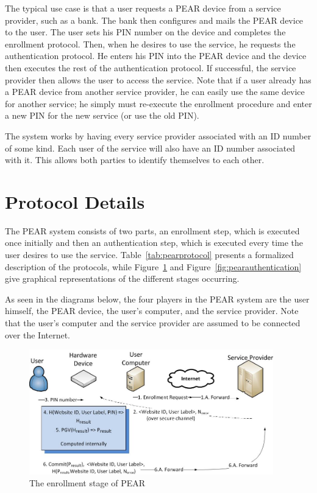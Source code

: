 The typical use case is that a user requests a PEAR device from a service provider, such as a bank. The bank then configures
and mails the PEAR device to the user. The user sets his PIN number on the device and completes the enrollment protocol.
Then, when he desires to use the service, he requests the authentication protocol. He enters his PIN into the PEAR device
and the device then executes the rest of the authentication protocol. If successful, the service provider then allows
the user to access the service. 
Note that if a user already has a PEAR device from another service provider, he can easily use the same device for another
service; he simply must re-execute the enrollment procedure and enter a new PIN for the new service (or use the old PIN).

The system works by having every service provider associated with an ID number of some kind. Each user of the service will
also have an ID number associated with it. This allows both parties to identify themselves to each other.

\section{Protocol Details}
The PEAR system consists of two parts, an enrollment step, which is executed once initially and then an authentication step,
which is executed every time the user desires to use the service.
Table~\ref{tab:pearprotocol} presents a formalized description of the protocols, while Figure~\ref{fig:pearenrollment}
and Figure~\ref{fig:pearauthentication} give graphical representations of the different stages occurring.

As seen in the diagrams below, the four players in the PEAR system are the user himself, the PEAR device, the user's computer,
and the service provider. Note that the user's computer and the service provider are assumed to be connected over the Internet.

\begin{figure}[!ht]
\includegraphics[width=400px]{images/enrollment.jpg}
\caption{The enrollment stage of PEAR}
\label{fig:pearenrollment}
\end{figure}
\FloatBarrier

